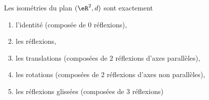 \begin{theorem}      \label{THOooVRNOooAgaVRN}
	Les isométries du plan \( (\eR^2,d)\) sont exactement
	\begin{enumerate}
		\item
		      l'identité (composée de \( 0\) réflexions),
		\item
		      les réflexions,
		\item
		      les translations (composées de \( 2\) réflexions d'axes parallèles),
		\item
		      les rotations (composées de \( 2\) réflexions d'axes non parallèles),
		\item
		      les réflexions glissées (composées de \( 3\) réflexions)
	\end{enumerate}
\end{theorem}

